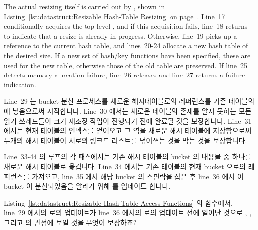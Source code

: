 The actual resizing itself is carried out by , shown in
Listing~\ref{lst:datastruct:Resizable Hash-Table Resizing} on
page~\pageref{lst:datastruct:Resizable Hash-Table Resizing}.
Line~17 conditionally acquires the top-level , and if
this acquisition fails, line~18 returns  to indicate that
a resize is already in progress.
Otherwise, line~19 picks up a reference to the current hash table,
and lines~20-24 allocate a new hash table of the desired size.
If a new set of hash/key functions have been specified, these are
used for the new table, otherwise those of the old table are preserved.
If line~25 detects memory-allocation failure, line~26 releases 
and line~27 returns a failure indication.
\fi

Line~29 는 bucket 분산 프로세스를 새로운 해시테이블로의 레퍼런스를 기존
테이블의  에 넣음으로써 시작합니다.
Line~30 에서는 새로운 테이블의 존재를 알지 못하는 모든 읽기 쓰레드들이 크기
재조정 작업이 진행되기 전에 완료될 것을 보장합니다.
Line~31 에서는 현재 테이블의 인덱스를 얻어오고 그 역을 새로운 해시 테이블에
저장함으로써 두개의 해시 테이블이 서로의 링크드 리스트를 덮어쓰는 것을 막는
것을 보장합니다.

Line~33-44 의 루프의 각 패스에서는 기존 해시 테이블의 bucket 의 내용물 중
하나를 새로운 해시 테이블로 옮깁니다.
Line~34 에서는 기존 테이블의 현재 bucket 으로의 레퍼런스를 가져오고, line~35
에서 해당 bucket 의 스핀락을 잡은 후 line~36 에서 이 bucket 이 분산되었음을
알리기 위해  를 업데이트 합니다.

\QuickQuiz{}
	Listing~\ref{lst:datastruct:Resizable Hash-Table Access Functions} 의
	 함수에서, line~29 에서의  로의
	업데이트가 line~36 에서의  로의 업데이트 전에
	일어난 것으로 , , 그리고
	 의 관점에 보일 것을 무엇이 보장하죠?
	\iffalse

